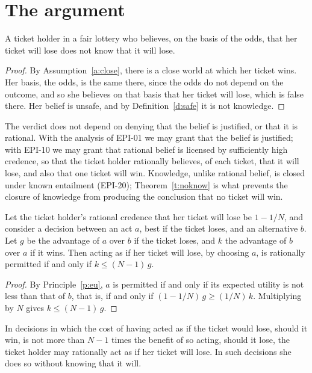 \documentclass{situationist-preprint}
\begin{document}
\section{The argument}

\begin{theorem}[No knowledge]\label{t:noknow}
A ticket holder in a fair lottery who believes, on the basis of the odds, that her ticket will lose does not know that it will lose.
\end{theorem}

\begin{proof}
By Assumption~\ref{a:close}, there is a close world at which her ticket wins. Her basis, the odds, is the same there, since the odds do not depend on the outcome, and so she believes on that basis that her ticket will lose, which is false there. Her belief is unsafe, and by Definition~\ref{d:safe} it is not knowledge.
\end{proof}

The verdict does not depend on denying that the belief is justified, or that it is rational. With the analysis of EPI-01 we may grant that the belief is justified; with EPI-10 we may grant that rational belief is licensed by sufficiently high credence, so that the ticket holder rationally believes, of each ticket, that it will lose, and also that one ticket will win. Knowledge, unlike rational belief, is closed under known entailment (EPI-20); Theorem~\ref{t:noknow} is what prevents the closure of knowledge from producing the conclusion that no ticket will win.

\begin{proposition}[Acting as if]\label{p:asif}
Let the ticket holder's rational credence that her ticket will lose be $1 - 1/N$, and consider a decision between an act $a$, best if the ticket loses, and an alternative $b$. Let $g$ be the advantage of $a$ over $b$ if the ticket loses, and $k$ the advantage of $b$ over $a$ if it wins. Then acting as if her ticket will lose, by choosing $a$, is rationally permitted if and only if $k \leq (N-1)\,g$.
\end{proposition}

\begin{proof}
By Principle~\ref{p:eu}, $a$ is permitted if and only if its expected utility is not less than that of $b$, that is, if and only if $(1 - 1/N)\,g \geq (1/N)\,k$. Multiplying by $N$ gives $k \leq (N-1)\,g$.
\end{proof}

\begin{corollary}\label{c:ordinary}
In decisions in which the cost of having acted as if the ticket would lose, should it win, is not more than $N - 1$ times the benefit of so acting, should it lose, the ticket holder may rationally act as if her ticket will lose. In such decisions she does so without knowing that it will.
\end{corollary}
\end{document}

